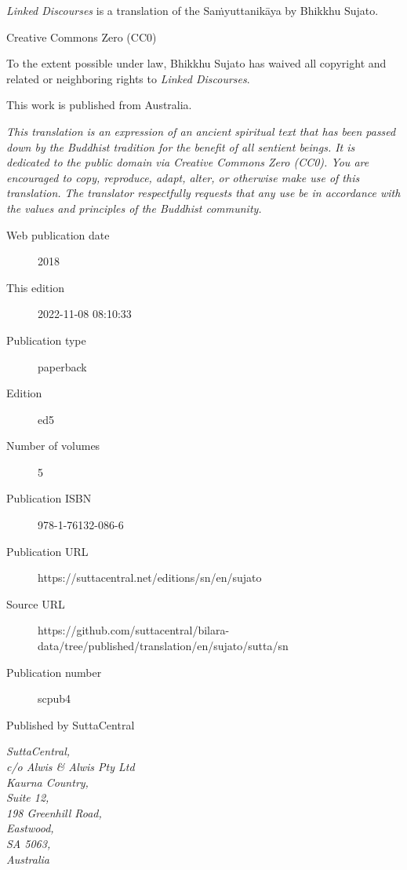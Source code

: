 \documentclass[12pt,openany]{book}%
\begin{document}
\begin{footnotesize}

\textit{Linked Discourses} is a translation of the Saṁyuttanikāya by Bhikkhu Sujato.

\medskip

Creative Commons Zero (CC0)

To the extent possible under law, Bhikkhu Sujato has waived all copyright and related or neighboring rights to \textit{Linked Discourses}.

\medskip

This work is published from Australia.

\begin{center}
\textit{This translation is an expression of an ancient spiritual text that has been passed down by the Buddhist tradition for the benefit of all sentient beings. It is dedicated to the public domain via Creative Commons Zero (CC0). You are encouraged to copy, reproduce, adapt, alter, or otherwise make use of this translation. The translator respectfully requests that any use be in accordance with the values and principles of the Buddhist community.}
\end{center}

\medskip

\begin{description}
    \item[Web publication date] 2018
    \item[This edition] 2022-11-08 08:10:33
    \item[Publication type] paperback
    \item[Edition] ed5
    \item[Number of volumes] 5
    \item[Publication ISBN] 978-1-76132-086-6
    \item[Publication URL] https://suttacentral.net/editions/sn/en/sujato
    \item[Source URL] https://github.com/suttacentral/bilara-data/tree/published/translation/en/sujato/sutta/sn
    \item[Publication number] scpub4
\end{description}

\medskip

Published by SuttaCentral

\medskip

\textit{SuttaCentral,\\
c/o Alwis \& Alwis Pty Ltd\\
Kaurna Country,\\
Suite 12,\\
198 Greenhill Road,\\
Eastwood,\\
SA 5063,\\
Australia}

\end{footnotesize}
\end{document}
